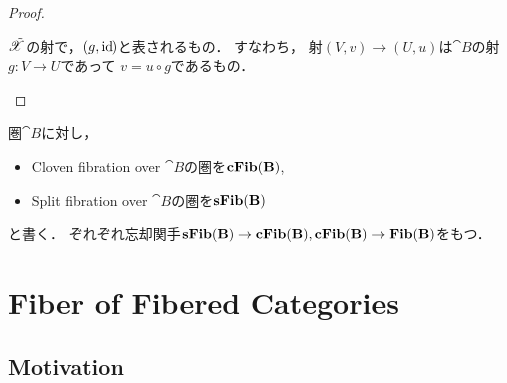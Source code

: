 \documentclass[a4paper, dvipdfmx]{jsarticle}
\begin{document}
\begin{proof}
\begin{description}[labelindent=1cm]
            \item[Arrows.]
                $\tilde{\mathscr{X}}$の射で，$(g, \mathrm{id}_{\!})$と表されるもの．
                すなわち，
                射$(V, v) \to (U, u)$は$\cat{B}$の射$g \colon V \to U$であって
                $v=u \circ g$であるもの．
                \begin{center}
                \end{center}
        \end{description}
    \end{proof}

    \begin{Def}
        圏$\cat{B}$に対し，
        \begin{itemize}
            \item Cloven fibration over $\cat{B}$の圏を$\mathbf{cFib}(\mathbf{B})$,
            \item Split fibration over $\cat{B}$の圏を$\mathbf{sFib}(\mathbf{B})$
        \end{itemize}
        と書く．
        ぞれぞれ忘却関手$\mathbf{sFib}(\mathbf{B}) \to \mathbf{cFib}(\mathbf{B}), \mathbf{cFib}(\mathbf{B}) \to \mathbf{Fib}(\mathbf{B})$をもつ．
    \end{Def}

\section{Fiber of Fibered Categories}
\subsection{Motivation}
\end{document}
